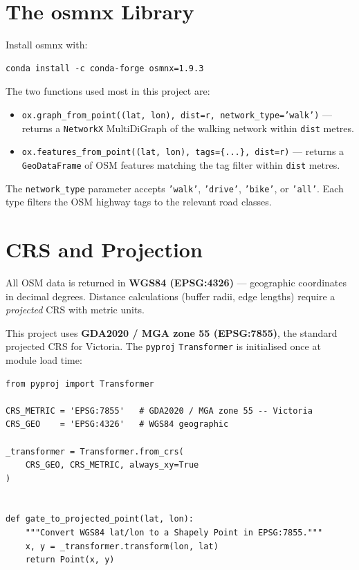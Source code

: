 \documentclass[11pt,a4paper,openany]{book}
\begin{document}
\section{The osmnx Library}

Install osmnx with:

\begin{lstlisting}[style=bash]
conda install -c conda-forge osmnx=1.9.3
\end{lstlisting}

The two functions used most in this project are:

\begin{itemize}
  \item \texttt{ox.graph\_from\_point((lat, lon), dist=r, network\_type='walk')} --- returns a \texttt{NetworkX} MultiDiGraph of the walking network within \texttt{dist} metres.
  \item \texttt{ox.features\_from\_point((lat, lon), tags=\{...\}, dist=r)} --- returns a \texttt{GeoDataFrame} of OSM features matching the tag filter within \texttt{dist} metres.
\end{itemize}

The \texttt{network\_type} parameter accepts \texttt{'walk'}, \texttt{'drive'}, \texttt{'bike'}, or \texttt{'all'}. Each type filters the OSM highway tags to the relevant road classes.

\section{CRS and Projection}

All OSM data is returned in \textbf{WGS84 (EPSG:4326)} --- geographic coordinates in decimal degrees. Distance calculations (buffer radii, edge lengths) require a \emph{projected} CRS with metric units.

This project uses \textbf{GDA2020 / MGA zone 55 (EPSG:7855)}, the standard projected CRS for Victoria. The \texttt{pyproj} \texttt{Transformer} is initialised once at module load time:

\begin{lstlisting}[style=python, caption={CRS constants and transformer in spatial\_features.py.}]
from pyproj import Transformer

CRS_METRIC = 'EPSG:7855'   # GDA2020 / MGA zone 55 -- Victoria
CRS_GEO    = 'EPSG:4326'   # WGS84 geographic

_transformer = Transformer.from_crs(
    CRS_GEO, CRS_METRIC, always_xy=True
)


def gate_to_projected_point(lat, lon):
    """Convert WGS84 lat/lon to a Shapely Point in EPSG:7855."""
    x, y = _transformer.transform(lon, lat)
    return Point(x, y)
\end{lstlisting}
\end{document}
